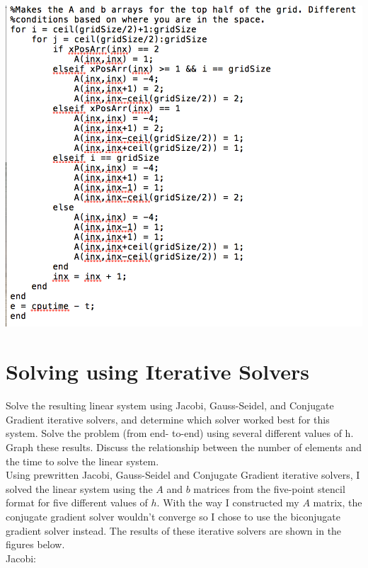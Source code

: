 \documentclass[11pt, oneside]{article}   	%
\begin{document}
\centerline{\includegraphics[scale = 0.7]{matrix5Code_2.png}} 

\section{Solving using Iterative Solvers}

Solve the resulting linear system using Jacobi, Gauss-Seidel, and Conjugate Gradient iterative solvers, and determine which solver worked best for this system. Solve the problem (from end- to-end) using several different values of h. Graph these results. Discuss the relationship between the number of elements and the time to solve the linear system. \\

Using prewritten Jacobi, Gauss-Seidel and Conjugate Gradient iterative solvers, I solved the linear system using the $A$ and $b$ matrices from the five-point stencil format for five different values of $h$. With the way I constructed my $A$ matrix, the conjugate gradient solver wouldn't converge so I chose to use the biconjugate gradient solver instead. The results of these iterative solvers are shown in the figures below. \\

Jacobi: \\
\end{document}
